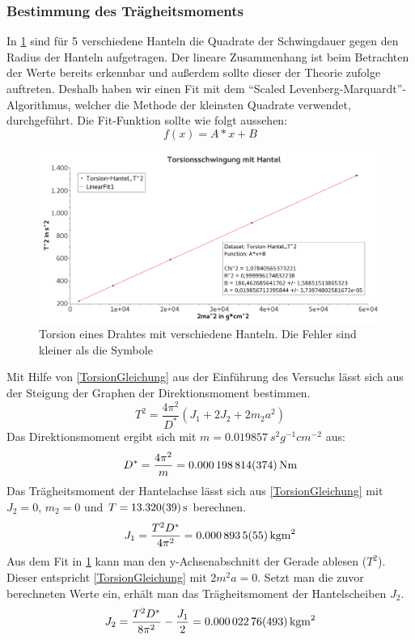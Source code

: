 \documentclass[
	a4paper,
	12pt,
	pagesize,
	ngerman
]{scrartcl}
\begin{document}
	\subsubsection*{Bestimmung des Trägheitsmoments}
	In \cref{TorsionGraph} sind für 5 verschiedene Hanteln die Quadrate der Schwingdauer gegen den Radius der Hanteln aufgetragen. Der lineare Zusammenhang ist beim Betrachten der Werte bereits erkennbar und außerdem sollte dieser der Theorie zufolge auftreten. %
	Deshalb haben wir einen Fit mit dem \enquote{Scaled Levenberg-Marquardt}-Algorithmus, welcher die Methode der kleinsten Quadrate verwendet, durchgeführt. Die Fit-Funktion sollte wie folgt aussehen:
	\begin{equation}
		f(x)=A*x+B
	\end{equation}
	\begin{figure}[tb]
		\includegraphics[width=1\textwidth]{Torsion}
		\centering
		\caption{Torsion eines Drahtes mit verschiedene Hanteln. Die Fehler sind kleiner als die Symbole}
		\label{TorsionGraph}
		\centering
	\end{figure}
	Mit Hilfe von \cref{TorsionGleichung} aus der Einführung des Versuchs lässt sich aus der Steigung der Graphen der Direktionsmoment bestimmen.
	\begin{equation}
		\label{TorsionGleichung}
		T^2 = \frac{4\pi^2}{D^*} (J_1 + 2J_2 + 2m_2 a^2)
	\end{equation}
	Das Direktionsmoment ergibt sich mit $m=\SI{0,019857}{s^2g^{-1}cm^{-2}}$ aus:
	\begin{equation}
	D^* = \frac{4\pi^2}{m} = \SI{0,000198814\pm 0,000000374}{Nm} %
	\end{equation}
	Das Trägheitsmoment der Hantelachse lässt sich aus \cref{TorsionGleichung} mit $J_2=0$, $m_2=0$ und $T=\SI{13,32 \pm0,039}{s}$ berechnen.
	\begin{equation}
		J_1= \frac{T^2D^*}{4\pi^2} = \SI{0,0008935 \pm ,0000055}{kgm^2}
	\end{equation}
	Aus dem Fit in \cref{TorsionGraph} kann man den y-Achsenabschnitt der Gerade ablesen ($T^2$). Dieser entspricht \cref{TorsionGleichung} mit $2m^2a=0$. Setzt man die zuvor berechneten Werte ein, erhält man das Trägheitsmoment der Hantelscheiben $J_2$. %
	\begin{equation}
		J_2 = \frac{T^2D^*}{8\pi^2} - \frac{J_1}{2} = \SI{0,00002276 \pm 0,00000493}{kgm^2}
	\end{equation}
\end{document}
